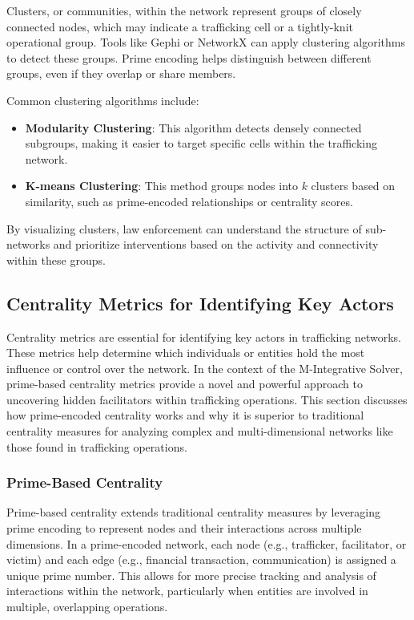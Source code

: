\documentclass[%
 preprint, linenumbers,
 amsmath,amssymb,
 aps, physrev,
]{revtex4-2}
\begin{document}
Clusters, or communities, within the network represent groups of closely connected nodes, which may indicate a trafficking cell or a tightly-knit operational group. Tools like Gephi or NetworkX can apply clustering algorithms to detect these groups. Prime encoding helps distinguish between different groups, even if they overlap or share members.

Common clustering algorithms include:

\begin{itemize}
    \item \textbf{Modularity Clustering}: This algorithm detects densely connected subgroups, making it easier to target specific cells within the trafficking network.
    \item \textbf{K-means Clustering}: This method groups nodes into \(k\) clusters based on similarity, such as prime-encoded relationships or centrality scores.
\end{itemize}

By visualizing clusters, law enforcement can understand the structure of sub-networks and prioritize interventions based on the activity and connectivity within these groups.


\subsection{Centrality Metrics for Identifying Key Actors}

Centrality metrics are essential for identifying key actors in trafficking networks. These metrics help determine which individuals or entities hold the most influence or control over the network. In the context of the M-Integrative Solver, prime-based centrality metrics provide a novel and powerful approach to uncovering hidden facilitators within trafficking operations. This section discusses how prime-encoded centrality works and why it is superior to traditional centrality measures for analyzing complex and multi-dimensional networks like those found in trafficking operations.

\subsubsection{Prime-Based Centrality}

Prime-based centrality extends traditional centrality measures by leveraging prime encoding to represent nodes and their interactions across multiple dimensions. In a prime-encoded network, each node (e.g., trafficker, facilitator, or victim) and each edge (e.g., financial transaction, communication) is assigned a unique prime number. This allows for more precise tracking and analysis of interactions within the network, particularly when entities are involved in multiple, overlapping operations.
\end{document}
